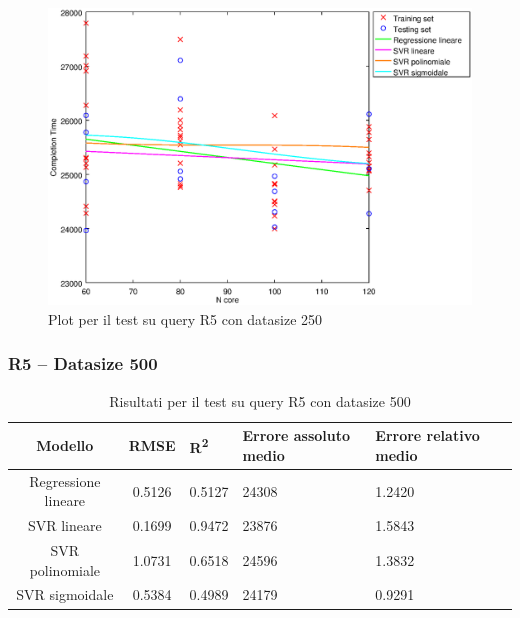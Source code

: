 \documentclass[a4paper,11pt]{article}
\begin{document}
\begin {figure}[hbtp]
\centering
\includegraphics[width=\textwidth]{output/R5_250/plot_R5_250.eps}
\caption {Plot per il test su query R5 con datasize 250}
\end {figure}
\newpage
\subsubsection{R5 -- Datasize 500}
\begin{table}[bhpt]
	\centering
	\begin{adjustbox}{center}
		\begin{tabular}{c | c M{1cm} M{2.5cm} M{2.5cm} M{1.8cm}}
			Modello & RMSE & R\textsuperscript{2} & Errore assoluto medio & Errore relativo medio \tabularnewline
			\hline
			Regressione lineare & 0.5126 & 0.5127 &  24308 & 1.2420 \\
			SVR lineare & 0.1699 & 0.9472 &  23876 & 1.5843 \\
			SVR polinomiale & 1.0731 & 0.6518 &  24596 & 1.3832 \\
			SVR sigmoidale & 0.5384 & 0.4989 &  24179 & 0.9291 \\
		\end{tabular}
	\end{adjustbox}
	\\
	\caption{Risultati per il test su query R5 con datasize 500}
	\label{table_R5_500}
\end{table}
\end{document}
